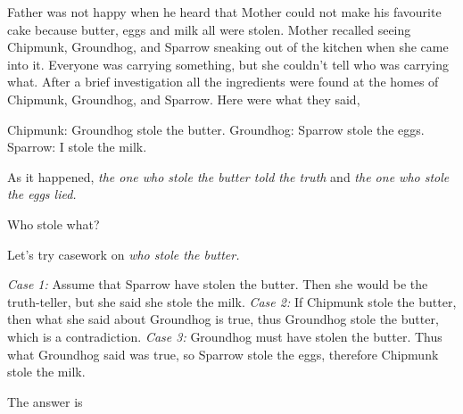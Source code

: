\documentclass{article}
\begin{document}
\begin{example*}
    \label{example:pi-2022-4-p8}
    Father was not happy when he heard that Mother could not make his favourite cake because butter, eggs and milk all were stolen.
    Mother recalled seeing Chipmunk, Groundhog, and Sparrow sneaking out of the kitchen when she came into it.
    Everyone was carrying something, but she couldn't tell who was carrying what.
    After a brief investigation all the ingredients were found at the homes of Chipmunk, Groundhog, and Sparrow.
    Here were what they said,
    \begin{itemize}[topsep=0pt, partopsep=0pt, itemsep=0pt]
        \ii Chipmunk: Groundhog stole the butter.
        \ii Groundhog: Sparrow stole the eggs.
        \ii Sparrow: I stole the milk.
    \end{itemize}
    As it happened, \textit{the one who stole the butter told the truth} and \textit{the one who stole the eggs lied.}

    Who stole what?
\end{example*}

\begin{soln} 
    Let's try casework on \textit{who stole the butter.}
    \begin{itemize}[topsep=0pt, partopsep=0pt, itemsep=0pt]
        \ii \textit{Case 1:} Assume that Sparrow have stolen the butter. 
        Then she would be the truth-teller, but she said she stole the milk.
        \ii \textit{Case 2:} If Chipmunk stole the butter, then what she said about Groundhog is true,
        thus Groundhog stole the butter, which is a contradiction.
        \ii \textit{Case 3:} Groundhog must have stolen the butter. 
        Thus what Groundhog said was true, so Sparrow stole the eggs, therefore Chipmunk stole the milk.
    \end{itemize}    
    The answer is 
\end{soln}
\end{document}
